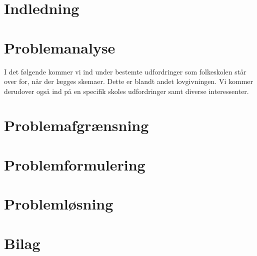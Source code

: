 \documentclass[12pt,hidelinks]{article}
\begin{document}
	\section{Indledning}
	
	\section{Problemanalyse}
	I det følgende kommer vi ind under bestemte udfordringer som folkeskolen står over for, når der lægges skemaer. Dette er blandt andet lovgivningen. Vi kommer derudover også ind på en specifik skoles udfordringer samt diverse interessenter.
	
	
	
	
	
	
	
	
	
	\section{Problemafgrænsning}
	
    \section{Problemformulering}
    
    \newpage
    \section{Problemløsning}
    
    \newpage
    
	
	

    \section{Bilag}
    
    
    \newpage
    
\end{document}
